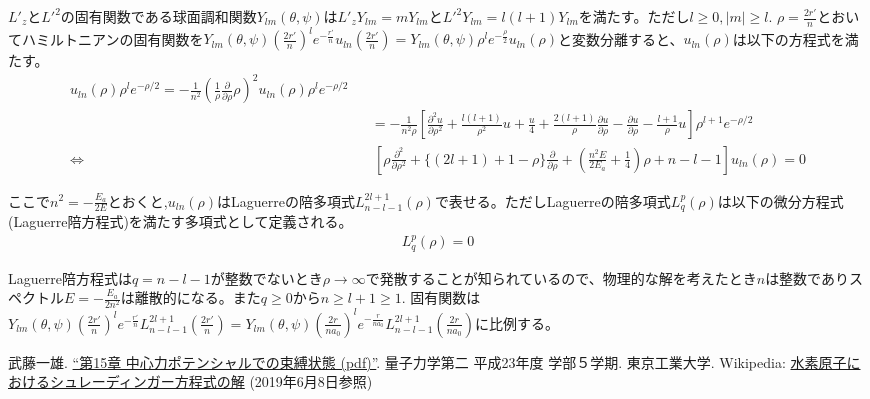 \documentclass[11pt,a4paper]{jsarticle}
\begin{document}
$L'_z$と$L'^2$の固有関数である球面調和関数$Y_{lm}(\theta,\psi)$は$L'_zY_{lm}=mY_{lm}$と$L'^2Y_{lm}=l(l+1)Y_{lm}$を満たす。ただし$l \ge 0, |m|\ge l$. $\rho=\frac{2r'}{n}$とおいてハミルトニアンの固有関数を$Y_{lm}(\theta,\psi)(\frac{2r'}{n})^l e^{-\frac{r'}{n}} u_{ln}(\frac{2r'}{n})=Y_{lm}(\theta,\psi) \rho^l e^{-\frac{\rho}{2}} u_{ln}(\rho)$と変数分離すると、$u_{ln}(\rho)$は以下の方程式を満たす。
\begin{eqnarray}
[ \frac{E}{2E_a} &&+ \frac{1}{n \rho} - \frac{l(l+1)}{n^2 \rho^2}]u_{ln}(\rho)\rho^l e^{-\rho/2} = -\frac{1}{n^2}(\frac{1}{\rho}\frac{\partial }{\partial \rho }\rho)^2  u_{ln}(\rho)\rho^l e^{-\rho/2}\\
&&= -\frac{1}{n^2 \rho} [\frac{\partial^2 u}{\partial \rho^2}+\frac{l(l+1)}{\rho^2}u +\frac{u}{4} +\frac{2(l+1)}{\rho}\frac{\partial u}{\partial \rho} -\frac{\partial u}{\partial \rho} -\frac{l+1}{ \rho} u] \rho^{l+1} e^{-\rho/2}\\
\Leftrightarrow && \: [ \rho \frac{\partial^2}{\partial \rho^2} + \{ (2l+1)+1-\rho \} \frac{\partial}{\partial \rho} + (\frac{n^2 E}{2E_a} + \frac{1}{4})\rho + n-l-1] u_{ln}(\rho) =0
\end{eqnarray}

ここで$n^2=-\frac{E_a}{2E}$とおくと,$u_{ln}(\rho)$はLaguerreの陪多項式$L^{2l+1}_{n-l-1}(\rho)$で表せる。ただしLaguerreの陪多項式$L^{p}_{q}(\rho)$は以下の微分方程式(Laguerre陪方程式)を満たす多項式として定義される。
\begin{eqnarray}
[ \rho \frac{\partial^2}{\partial \rho^2} + ( p+1-\rho ) \frac{\partial}{\partial \rho} + q] L^{p}_{q}(\rho)=0
\end{eqnarray}

Laguerre陪方程式は$q=n-l-1$が整数でないとき$\rho \rightarrow \infty$で発散することが知られているので、物理的な解を考えたとき$n$は整数でありスペクトル$E=-\frac{E_a}{2n^2}$は離散的になる。また$q\ge0$から$n\ge l+1\ge1$. 固有関数は$Y_{lm}(\theta,\psi)(\frac{2r'}{n})^l e^{-\frac{r'}{n}} L^{2l+1}_{n-l-1}(\frac{2r'}{n})=Y_{lm}(\theta,\psi)(\frac{2r}{na_0})^l e^{-\frac{r}{na_0}} L^{2l+1}_{n-l-1}(\frac{2r}{na_0})$に比例する。


\begin{thebibliography}{9}
 武藤一雄. \href{http://www.th.phys.titech.ac.jp/~muto/lectures/QMII11/QMII11_chap15.pdf}{“第15章 中心力ポテンシャルでの束縛状態 (pdf)”}. 量子力学第二 平成23年度 学部５学期. 東京工業大学. 
 Wikipedia: \href{https://ja.wikipedia.org/wiki/水素原子におけるシュレーディンガー方程式の解}{水素原子におけるシュレーディンガー方程式の解} (2019年6月8日参照)
\end{thebibliography}
\end{document}
